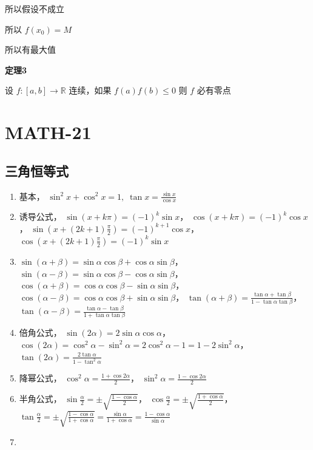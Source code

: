 所以假设不成立

所以 \(f(x_{0})=M\)

所以有最大值

\textbf{定理3}

设 \(f:[a,b]\to \mathbb{R}\) 连续，如果 \(f(a)f(b)\leq 0\) 则 \(f\)
必有零点

\section{MATH-21}\label{math-21}

\subsection{三角恒等式}\label{ux4e09ux89d2ux6052ux7b49ux5f0f}

\begin{enumerate}
\def\labelenumi{\arabic{enumi}.}
\tightlist
\item
  基本， \(\sin ^{2} x+\cos ^{2}x=1, \;\tan x= \frac{\sin x }{\cos x}\)
\item
  诱导公式， \(\sin(x+k\pi)=(-1)^{k}\sin x\)，
  \(\cos (x+k\pi)=(-1)^{k}\cos x\)，
  \(\sin\left( x+(2k+1)\frac{\pi}{2} \right) =(-1)^{k+1}\cos x\)，
  \(\cos\left( x+(2k+1) \frac{\pi}{2} \right)=(-1)^{k}\sin x\)
\item
  \(\sin(\alpha +\beta)=\sin \alpha \cos \beta+\cos \alpha \sin \beta\)，
  \(\sin(\alpha -\beta)=\sin \alpha \cos \beta-\cos \alpha \sin \beta\)，
  \(\cos(\alpha+\beta)=\cos \alpha \cos \beta-\sin \alpha \sin \beta\)，
  \(\cos(\alpha-\beta)=\cos \alpha \cos \beta+\sin \alpha \sin \beta\)，
  \(\tan(\alpha+\beta)=\frac{\tan \alpha+\tan \beta}{1-\tan \alpha \tan \beta}\)，
  \(\tan(\alpha-\beta )=\frac{\tan \alpha-\tan \beta}{1+\tan \alpha \tan \beta}\)
\item
  倍角公式， \(\sin(2\alpha)=2\sin \alpha \cos \alpha\)，
  \(\cos(2\alpha)=\cos ^{2}\alpha-\sin ^{2}\alpha=2\cos ^{2}\alpha-1=1-2\sin ^{2}\alpha\)，
  \(\tan(2\alpha)=\frac{2\tan \alpha}{1-\tan ^{2}\alpha}\)
\item
  降幂公式， \(\cos ^{2}\alpha=\frac{1+\cos 2\alpha}{2}\)，
  \(\sin ^{2}\alpha=\frac{1-\cos 2\alpha}{2}\)
\item
  半角公式，
  \(\sin \frac{\alpha}{2}=\pm \sqrt{ \frac{1-\cos \alpha}{2} }\)，
  \(\cos \frac{\alpha}{2}=\pm \sqrt{ \frac{1+\cos \alpha}{2} }\)，
  \(\tan \frac{\alpha}{2}=\pm \sqrt{ \frac{1-\cos \alpha}{1+\cos \alpha} }=\frac{\sin \alpha}{1+\cos \alpha}= \frac{1-\cos \alpha}{\sin \alpha}\)
\item

\end{enumerate}
